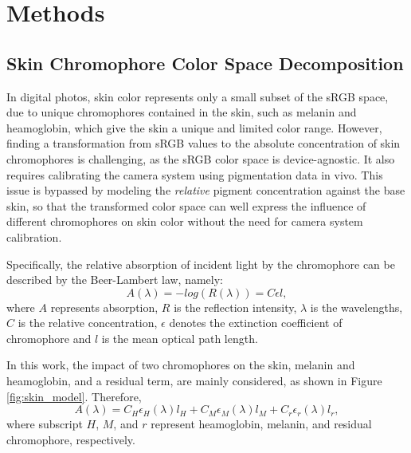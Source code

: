 
\chapter{Methods}
\begin{spacing}{1.5}
\setlength{\parskip}{0.3in}


\section{Skin Chromophore Color Space Decomposition}
In digital photos, skin color represents only a small subset of the sRGB space, due to unique chromophores contained in the skin, such as melanin and heamoglobin, which give the skin a unique and limited color range. However, finding a transformation from sRGB values to the absolute concentration of skin chromophores is challenging, as the sRGB color space is device-agnostic. It also requires calibrating the camera system using pigmentation data in vivo. This issue is bypassed by modeling the \textit{relative} pigment concentration against the base skin, so that the transformed color space can well express the influence of different chromophores on skin color without the need for camera system calibration.

Specifically, the relative absorption of incident light by the chromophore can be described by the Beer-Lambert law, namely:
\begin{equation}
    A(\lambda) = -log(R(\lambda)) = C\epsilon l,
    \label{eq1}
\end{equation}
where $A$ represents absorption, $R$ is the reflection intensity, $\lambda$ is the wavelengths, $C$ is the relative concentration, $\epsilon$ denotes the extinction coefficient of chromophore and $l$ is the mean optical path length.

In this work, the impact of two chromophores on the skin, melanin and heamoglobin, and a residual term, are mainly considered, as shown in Figure \ref{fig:skin_model}. Therefore,
\begin{equation}
    A(\lambda) = C_H\epsilon_H(\lambda)l_H + C_M\epsilon_M(\lambda)l_M + C_r\epsilon_r(\lambda)l_r,
    \label{eq2}
\end{equation}
where subscript $H$, $M$, and $r$ represent heamoglobin, melanin, and residual chromophore, respectively.


\end{spacing}
